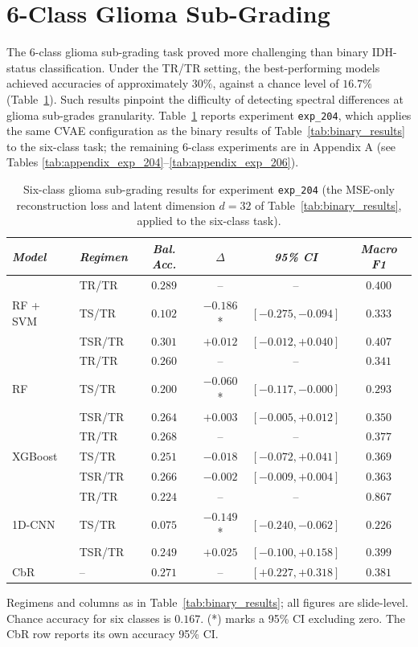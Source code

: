 \section{6-Class Glioma Sub-Grading}
\label{sec:results_6class}


The 6-class glioma sub-grading task proved more challenging than binary IDH-status classification. Under the TR/TR setting, the best-performing models achieved accuracies of approximately $30\%$, against a chance level of $16.7\%$ (Table~\ref{tab:sixclass_results}). Such results pinpoint the difficulty of detecting spectral differences at glioma sub-grades granularity. Table~\ref{tab:sixclass_results} reports experiment \texttt{exp\_204}, which applies the same CVAE configuration as the binary results of Table~\ref{tab:binary_results} to the six-class task; the remaining 6-class experiments are in Appendix A (see Tables \ref{tab:appendix_exp_204}--\ref{tab:appendix_exp_206}).

\begin{table}[h]
\caption{Six-class glioma sub-grading results for experiment \texttt{exp\_204} (the MSE-only
reconstruction loss and latent dimension $d=32$ of Table~\ref{tab:binary_results}, applied to
the six-class task).}
\label{tab:sixclass_results}
\small
\begin{tabular*}{\textwidth}{@{\extracolsep{\fill}}llcccc}
\toprule
\emph{Model} & \emph{Regimen} & \emph{Bal. Acc.} & \emph{$\Delta$} & \emph{95\% CI} & \emph{Macro F1}\\
\midrule
\multirow{3}{*}{RF + SVM} & TR/TR & $0.289$ & -- & -- & $0.400$ \\
 & TS/TR & $0.102$ & $-0.186$* & $[-0.275, -0.094]$ & $0.333$ \\
 & TSR/TR & $0.301$ & $+0.012$ & $[-0.012, +0.040]$ & $0.407$ \\
\midrule
\multirow{3}{*}{RF} & TR/TR & $0.260$ & -- & -- & $0.341$ \\
 & TS/TR & $0.200$ & $-0.060$* & $[-0.117, -0.000]$ & $0.293$ \\
 & TSR/TR & $0.264$ & $+0.003$ & $[-0.005, +0.012]$ & $0.350$ \\
\midrule
\multirow{3}{*}{XGBoost} & TR/TR & $0.268$ & -- & -- & $0.377$ \\
 & TS/TR & $0.251$ & $-0.018$ & $[-0.072, +0.041]$ & $0.369$ \\
 & TSR/TR & $0.266$ & $-0.002$ & $[-0.009, +0.004]$ & $0.363$ \\
\midrule
\multirow{3}{*}{1D-CNN} & TR/TR & $0.224$ & -- & -- & $0.867$ \\
 & TS/TR & $0.075$ & $-0.149$* & $[-0.240, -0.062]$ & $0.226$ \\
 & TSR/TR & $0.249$ & $+0.025$ & $[-0.100, +0.158]$ & $0.399$ \\
\midrule
CbR & -- & $0.271$ & -- & $[+0.227, +0.318]$ & $0.381$ \\
\bottomrule
\end{tabular*}
\small{Regimens and columns as in Table~\ref{tab:binary_results}; all figures are slide-level.
Chance accuracy for six classes is $0.167$. (*) marks a 95\% CI excluding zero. The CbR row
reports its own accuracy 95\% CI.}
\end{table}

